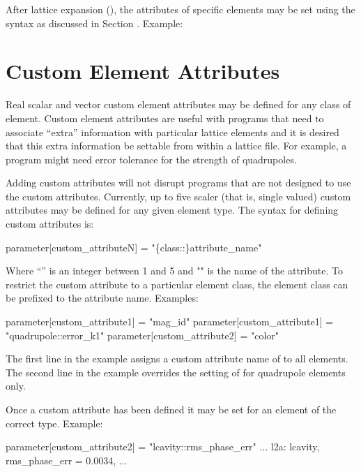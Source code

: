 {{After lattice expansion (), the attributes of specific elements
may be set using the syntax as discussed in Section . Example:

\section{Custom Element Attributes}
\label{s:cust.att}

Real scalar and vector custom element attributes may be defined for any class of
element.  Custom element attributes are useful with programs that need
to associate ``extra'' information with particular lattice elements
and it is desired that this extra information be settable from within
a lattice file. For example, a program might need error tolerance
for the strength of quadrupoles.

Adding custom attributes will not disrupt programs that are not designed to use the custom
attributes. Currently, up to five scaler (that is, single valued) custom attributes may be
defined for any given element type. The syntax for defining custom attributes is:
\begin{example}
  parameter[custom_attributeN] = "\{class::\}attribute_name"
\end{example}
Where ``'' is an integer between 1 and 5 and
"" is the name of the attribute. To restrict the
custom attribute to a particular element class, the element class can
be prefixed to the attribute name. Examples:
\begin{example}
  parameter[custom_attribute1] = "mag_id"
  parameter[custom_attribute1] = "quadrupole::error_k1"
  parameter[custom_attribute2] = "color"
\end{example}
The first line in the example assigns a custom attribute name of
 to all elements.  The second line in the example overrides
the setting of  for quadrupole elements only. 

Once a custom attribute has been defined it may be set for an element
of the correct type. Example:
\begin{example}
  parameter[custom_attribute2] = "lcavity::rms_phase_err"
  ...
  l2a: lcavity, rms_phase_err = 0.0034, ...
\end{example}

}}
